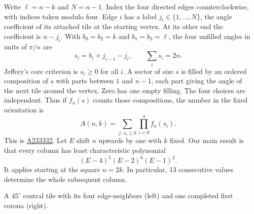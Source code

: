 \documentclass[11pt,letterpaper]{article}
\newcommand{\oid}[1]{\href{https://oeis.org/A#1}{A#1}}
\begin{document}
Write $\ell=n-k$ and $N=n-1$. Index the four directed edges counterclockwise, with indices taken modulo four. Edge $i$ has a label $j_i\in\{1,\ldots,N\}$, the angle coefficient of its attached tile at the starting vertex. At its other end the coefficient is $n-j_i$. With $b_0=b_2=k$ and $b_1=b_3=\ell$, the four unfilled angles in units of $\pi/n$ are
\[
    s_i=b_i+j_{i-1}-j_i,\qquad \sum_i s_i=2n .
\]
Jeffery's core criterion is $s_i\ge0$ for all $i$. A sector of size $s$ is filled by an ordered composition of $s$ with parts between $1$ and $n-1$, each part giving the angle of the next tile around the vertex. Zero has one empty filling. The four choices are independent. Thus if $f_n(s)$ counts those compositions, the number in the fixed orientation is
\begin{equation}\label{eq:jeffery}
 A(n,k)=\sum_{j:\,s_i\ge0}\prod_{i=0}^3 f_n(s_i).
\end{equation}
This is \oid{233332}. Let $E$ shift $n$ upwards by one with $k$ fixed. Our main result is that every column has least characteristic polynomial
\[
                       (E-4)^5(E-2)^6(E-1)^2.
\]
It applies starting at the square $n=2k$. In particular, 13 consecutive values determine the whole subsequent column.
\begin{center}
\par
{\small A $45^\circ$ central tile with its four edge-neighbors (left) and one completed first corona (right).}
\end{center}
\end{document}
